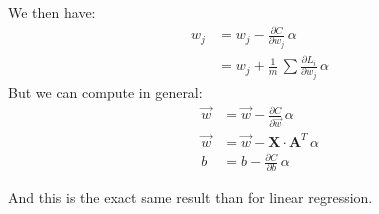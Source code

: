 We then have:
\begin{align}
  w_j &= w_j - \frac{\partial C}{\partial w_j}\,\alpha\\
  &= w_j + \frac{1}{m}\,\sum \frac{\partial L_i}{\partial w_j}\,\alpha\label{eq:same}
\end{align}
But we can compute in general:
\begin{align}
  \vec{w} &= \vec{w} - \frac{\partial C}{\partial \vec{w}}\,\alpha\\
  \vec{w} &= \vec{w} - \mathbf{X}\cdot{}\mathbf{A}^T\,\alpha\\
  b &= b - \frac{\partial C}{\partial b}\,\alpha
\end{align}

And this is the exact same result than for linear regression. 
